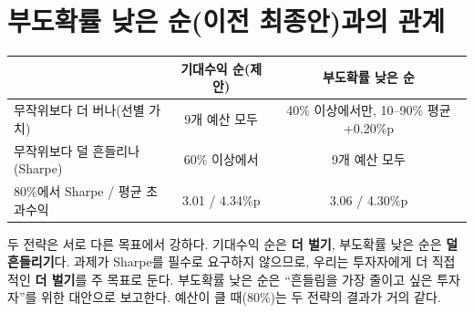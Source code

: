 \documentclass[11pt]{report}
\begin{document}
\section{부도확률 낮은 순(이전 최종안)과의 관계}
\begin{table}[H]\centering\small
\begin{tabularx}{\linewidth}{@{}Qcc@{}}\toprule
 & \textbf{기대수익 순(제안)} & 부도확률 낮은 순\\\midrule
무작위보다 더 버나(선별 가치) & 9개 예산 모두 & 40\% 이상에서만, 10--90\% 평균 +0.20\%p\\
무작위보다 덜 흔들리나(Sharpe) & 60\% 이상에서 & 9개 예산 모두\\
80\%에서 Sharpe / 평균 초과수익 & 3.01 / 4.34\%p & 3.06 / 4.30\%p\\\bottomrule
\end{tabularx}
\end{table}
두 전략은 서로 다른 목표에서 강하다. 기대수익 순은 \textbf{더 벌기}, 부도확률 낮은 순은 \textbf{덜 흔들리기}다. 과제가 Sharpe를 필수로 요구하지 않으므로, 우리는 투자자에게 더 직접적인 \textbf{더 벌기}를 주 목표로 둔다. 부도확률 낮은 순은 ``흔들림을 가장 줄이고 싶은 투자자''를 위한 대안으로 보고한다. 예산이 클 때(80\%)는 두 전략의 결과가 거의 같다.
\end{document}
